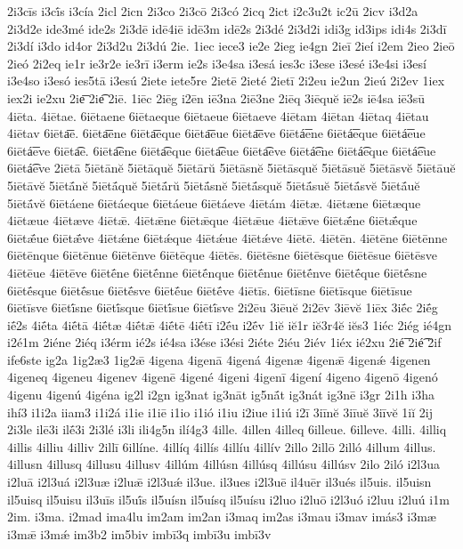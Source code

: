 {2i3cīs
i3cī́s
i3cía
2icl
2icn
2i3co
2i3cō
2i3có
2icq
2ict
i2c3u2t
ic2ū
2icv
i3d2a
2i3d2e
ide3mé
ide2s
2i3dē
idē4iē
idē3m
idē2s
2i3dé
2i3d2i
idi3g
id3ips
idi4s
2i3dī
2i3dí
i3do
id4or
2i3d2u
2i3dú
2ie.
1iec
iece3
ie2e
2ieg
ie4gn
2ieī
2ieí
i2em
2ieo
2ieō
2ieó
2i2eq
ie1r
ie3r2e
ie3rī
i3erm
ie2s
i3e4sa
i3esá
ies3c
i3ese
i3esé
i3e4si
i3esí
i3e4so
i3esó
ies5tā
i3esú
2iete
iete5re
2ietē
2ieté
2ietī
2i2eu
ie2un
2ieú
2i2ev
1iex
iex2i
ie2xu
2ie͞
2ie͡
2iē.
1iēc
2iēg
i2ēn
iē3na
2iē3ne
2iēq
3iēquĕ
iē2s
iē4sa
iē3sū
4iēta.
4iētae.
6iētaene
6iētaeque
6iētaeue
6iētaeve
4iētam
4iētan
4iētaq
4iētau
4iētav
6iēta͞e.
6iēta͞ene
6iēta͞eque
6iēta͞eue
6iēta͞eve
6iētá͞ene
6iētá͞eque
6iētá͞eue
6iētá͞eve
6iēta͡e.
6iēta͡ene
6iēta͡eque
6iēta͡eue
6iēta͡eve
6iētá͡ene
6iētá͡eque
6iētá͡eue
6iētá͡eve
2iētā
5iētānĕ
5iētāquĕ
5iētārŭ
5iētāsnĕ
5iētāsquĕ
5iētāsuĕ
5iētāsvĕ
5iētāuĕ
5iētāvĕ
5iētā́nĕ
5iētā́quĕ
5iētā́rŭ
5iētā́snĕ
5iētā́squĕ
5iētā́suĕ
5iētā́svĕ
5iētā́uĕ
5iētā́vĕ
6iētáene
6iētáeque
6iētáeue
6iētáeve
4iētám
4iētæ.
4iētæne
6iētæque
4iētæue
4iētæve
4iētǣ.
4iētǣne
6iētǣque
4iētǣue
4iētǣve
6iētǣ́ne
6iētǣ́que
6iētǣ́ue
6iētǣ́ve
4iētǽne
6iētǽque
4iētǽue
4iētǽve
4iētē.
4iētēn.
4iētēne
6iētēnne
6iētēnque
6iētēnue
6iētēnve
6iētēque
4iētēs.
6iētēsne
6iētēsque
6iētēsue
6iētēsve
4iētēue
4iētēve
6iētḗne
6iētḗnne
6iētḗnque
6iētḗnue
6iētḗnve
6iētḗque
6iētḗsne
6iētḗsque
6iētḗsue
6iētḗsve
6iētḗue
6iētḗve
4iētīs.
6iētīsne
6iētīsque
6iētīsue
6iētīsve
6iētī́sne
6iētī́sque
6iētī́sue
6iētī́sve
2i2ēu
3iēuĕ
2i2ēv
3iēvĕ
1iēx
3iḗc
2iḗg
iḗ2s
4iḗta
4iḗtā
4iḗtæ
4iḗtǣ
4iḗtē
4iḗtī
i2ḗu
i2ḗv
1iĕ
iĕ1r
iĕ3r4ĕ
iĕs3
1iéc
2iég
ié4gn
i2é1m
2iéne
2iéq
i3érm
ié2s
ié4sa
i3ése
i3ési
2iéte
2iéu
2iév
1iéx
ié2xu
2ié͞
2ié͡
2if
ife6ste
ig2a
1ig2æ3
1ig2ǣ
4igena
4igenā
4igená
4igenæ
4igenǣ
4igenǽ
4igenen
4igeneq
4igeneu
4igenev
4igenē
4igené
4igeni
4igenī
4igení
4igeno
4igenō
4igenó
4igenu
4igenú
4igéna
ig2l
i2gn
ig3nat
ig3nāt
ig5nā́t
ig3nát
ig3nē
i3gr
2i1h
i3ha
ihí3
i1i2a
iiam3
i1i2á
i1ie
i1iē
i1io
i1ió
i1iu
i2iue
i1iú
i2ī
3iīnĕ
3iīuĕ
3iīvĕ
1iĭ
2ij
2i3le
ilē3i
ilḗ3i
2i3lé
i3li
ili4g5n
ilí4g3
4ille.
4illen
4illeq
6illeue.
6illeve.
4illi.
4illiq
4illis
4illiu
4illiv
2illī
6illíne.
4illíq
4illís
4illíu
4illív
2illo
2illō
2illó
4illum
4illus.
4illusn
4illusq
4illusu
4illusv
4illúm
4illúsn
4illúsq
4illúsu
4illúsv
2ilo
2iló
i2l3ua
i2luā
i2l3uá
i2l3uæ
i2luǣ
i2l3uǽ
il3ue.
il3ues
i2l3uē
il4uēr
il3ués
il5uis.
il5uisn
il5uisq
il5uisu
il3uīs
il5uī́s
il5uísn
il5uísq
il5uísu
i2luo
i2luō
i2l3uó
i2luu
i2luú
i1m
2im.
i3ma.
i2mad
ima4lu
im2am
im2an
i3maq
im2as
i3mau
i3mav
imás3
i3mæ
i3mǣ
i3mǽ
im3b2
im5biv
imbī3q
imbī3u
imbī3v
}

